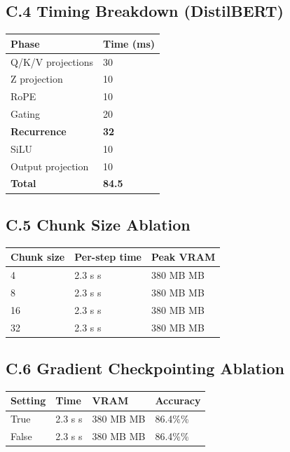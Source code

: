 \subsection{C.4 Timing Breakdown (DistilBERT)}

\begin{table}[H]
\centering
\small
\begin{tabular}{ll}
\toprule
\textbf{Phase} & \textbf{Time (ms)} \\
\midrule
Q/K/V projections & 30 \\
Z projection & 10 \\
RoPE & 10 \\
Gating & 20 \\
\textbf{Recurrence} & \textbf{32} \\
SiLU & 10 \\
Output projection & 10 \\
\textbf{Total} & \textbf{84.5} \\
\bottomrule
\end{tabular}
\end{table}

\subsection{C.5 Chunk Size Ablation}

\begin{table}[H]
\centering
\small
\begin{tabular}{lll}
\toprule
\textbf{Chunk size} & \textbf{Per-step time} & \textbf{Peak VRAM} \\
\midrule
4 & 2.3 s s & 380 MB MB \\
8 & 2.3 s s & 380 MB MB \\
16 & 2.3 s s & 380 MB MB \\
32 & 2.3 s s & 380 MB MB \\
\bottomrule
\end{tabular}
\end{table}

\subsection{C.6 Gradient Checkpointing Ablation}

\begin{table}[H]
\centering
\small
\begin{tabular}{llll}
\toprule
\textbf{Setting} & \textbf{Time} & \textbf{VRAM} & \textbf{Accuracy} \\
\midrule
True & 2.3 s s & 380 MB MB & 86.4\%\% \\
False & 2.3 s s & 380 MB MB & 86.4\%\% \\
\bottomrule
\end{tabular}
\end{table}


